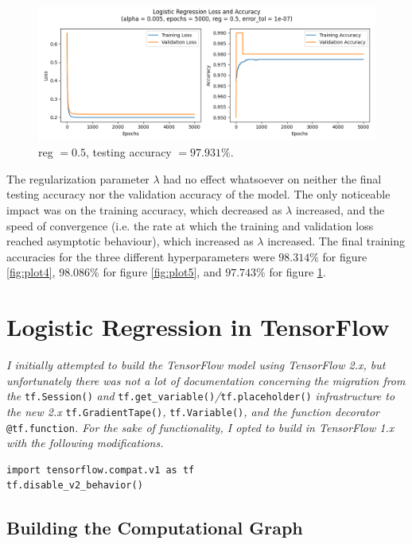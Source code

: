 \documentclass[letter]{article}
\begin{document}
\begin{figure}[H]
	\centering
	\includegraphics[width=\linewidth]{Figure_6}
	\caption{reg $ = 0.5$, testing accuracy $ = 97.931\%$.}
	\label{fig:plot6}
\end{figure}

The regularization parameter $\lambda$ had no effect whatsoever on neither the final testing accuracy nor the validation accuracy of the model. The only noticeable impact was on the training accuracy, which decreased as $\lambda$ increased, and the speed of convergence (i.e. the rate at which the training and validation loss reached asymptotic behaviour), which increased as $\lambda$ increased. The final training accuracies for the three different hyperparameters were $98.314\%$ for figure \ref{fig:plot4}, $98.086\%$ for figure \ref{fig:plot5}, and $97.743\%$ for figure \ref{fig:plot6}.

\newpage

\section{Logistic Regression in TensorFlow}

\textit{I initially attempted to build the TensorFlow model using TensorFlow 2.x, but unfortunately there was not a lot of documentation concerning the migration from the} \texttt{tf.Session()} \textit{and}  \texttt{tf.get\_variable()}\textit{/}\texttt{tf.placeholder()} \textit{infrastructure to the new 2.x} \texttt{tf.GradientTape()}\textit{,} \texttt{tf.Variable()}\textit{, and the function decorator} \texttt{@tf.function}\textit{. For the sake of functionality, I opted to build in TensorFlow 1.x with the following modifications.}

\begin{lstlisting}
import tensorflow.compat.v1 as tf
tf.disable_v2_behavior()
\end{lstlisting}

\subsection{Building the Computational Graph}
\end{document}
